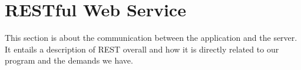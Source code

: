\section{RESTful Web Service}
\label{sec:rest}

This section is about the communication between the application and the server. It entails a description of REST overall and how it is directly related to our program and the demands we have.



